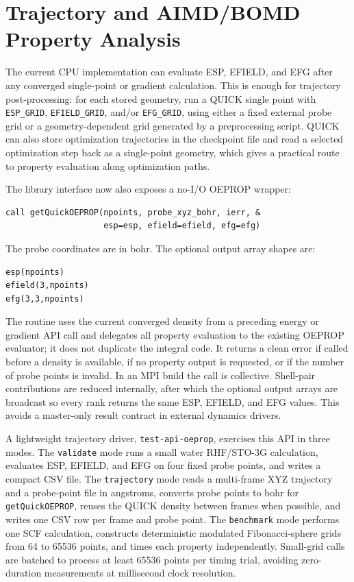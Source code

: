 \documentclass[journal=jcisd8,manuscript=suppinfo]{achemso}
\begin{document}
\section{Trajectory and AIMD/BOMD Property Analysis}

The current CPU implementation can evaluate ESP, EFIELD, and EFG after any converged single-point or gradient calculation.  This is enough for trajectory post-processing: for each stored geometry, run a QUICK single point with \texttt{ESP\_GRID}, \texttt{EFIELD\_GRID}, and/or \texttt{EFG\_GRID}, using either a fixed external probe grid or a geometry-dependent grid generated by a preprocessing script.  QUICK can also store optimization trajectories in the checkpoint file and read a selected optimization step back as a single-point geometry, which gives a practical route to property evaluation along optimization paths.

The library interface now also exposes a no-I/O OEPROP wrapper:
\begin{verbatim}
call getQuickOEPROP(npoints, probe_xyz_bohr, ierr, &
                    esp=esp, efield=efield, efg=efg)
\end{verbatim}
The probe coordinates are in bohr.  The optional output array shapes are:
\begin{verbatim}
esp(npoints)
efield(3,npoints)
efg(3,3,npoints)
\end{verbatim}
The routine uses the current converged density from a preceding energy or gradient API call and delegates all property evaluation to the existing OEPROP evaluator; it does not duplicate the integral code.  It returns a clean error if called before a density is available, if no property output is requested, or if the number of probe points is invalid.  In an MPI build the call is collective.  Shell-pair contributions are reduced internally, after which the optional output arrays are broadcast so every rank returns the same ESP, EFIELD, and EFG values.  This avoids a master-only result contract in external dynamics drivers.

A lightweight trajectory driver, \texttt{test-api-oeprop}, exercises this API in three modes.  The \texttt{validate} mode runs a small water RHF/STO-3G calculation, evaluates ESP, EFIELD, and EFG on four fixed probe points, and writes a compact CSV file.  The \texttt{trajectory} mode reads a multi-frame XYZ trajectory and a probe-point file in angstroms, converts probe points to bohr for \texttt{getQuickOEPROP}, reuses the QUICK density between frames when possible, and writes one CSV row per frame and probe point.  The \texttt{benchmark} mode performs one SCF calculation, constructs deterministic modulated Fibonacci-sphere grids from 64 to 65536 points, and times each property independently.  Small-grid calls are batched to process at least 65536 points per timing trial, avoiding zero-duration measurements at millisecond clock resolution.
\end{document}
